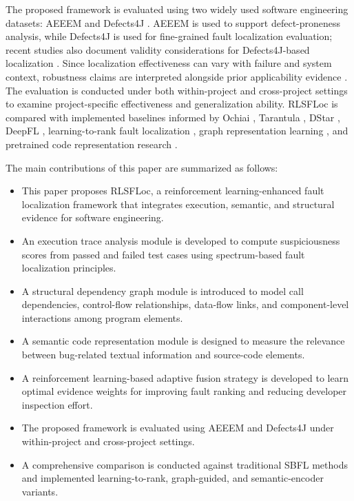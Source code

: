 \documentclass[article,article,submit,pdftex,moreauthors]{Definitions/mdpi}
\begin{document}
The proposed framework is evaluated using two widely used software engineering datasets: AEEEM \cite{dambros2010aeeem} and Defects4J \cite{just2014defects4j}. AEEEM is used to support defect-proneness analysis, while Defects4J is used for fine-grained fault localization evaluation; recent studies also document validity considerations for Defects4J-based localization \cite{abouassi2019coincidental,rafi2024cleanness}. Since localization effectiveness can vary with failure and system context, robustness claims are interpreted alongside prior applicability evidence \cite{le2013effectiveness,sha2022server}. The evaluation is conducted under both within-project and cross-project settings to examine project-specific effectiveness and generalization ability. RLSFLoc is compared with implemented baselines informed by Ochiai \cite{abreu2007ochiai}, Tarantula \cite{jones2005tarantula}, DStar \cite{wong2014dstar}, DeepFL \cite{li2019deepfl}, learning-to-rank fault localization \cite{xuan2014learning}, graph representation learning \cite{lou2021grace}, and pretrained code representation research \cite{feng2020codebert}.

The main contributions of this paper are summarized as follows:

\begin{itemize}
    \item This paper proposes RLSFLoc, a reinforcement learning-enhanced fault localization framework that integrates execution, semantic, and structural evidence for software engineering.
    
    \item An execution trace analysis module is developed to compute suspiciousness scores from passed and failed test cases using spectrum-based fault localization principles.
    
    \item A structural dependency graph module is introduced to model call dependencies, control-flow relationships, data-flow links, and component-level interactions among program elements.
    
    \item A semantic code representation module is designed to measure the relevance between bug-related textual information and source-code elements.
    
    \item A reinforcement learning-based adaptive fusion strategy is developed to learn optimal evidence weights for improving fault ranking and reducing developer inspection effort.
    
    \item The proposed framework is evaluated using AEEEM and Defects4J under within-project and cross-project settings.
    
    \item A comprehensive comparison is conducted against traditional SBFL methods and implemented learning-to-rank, graph-guided, and semantic-encoder variants.
\end{itemize}
\end{document}
